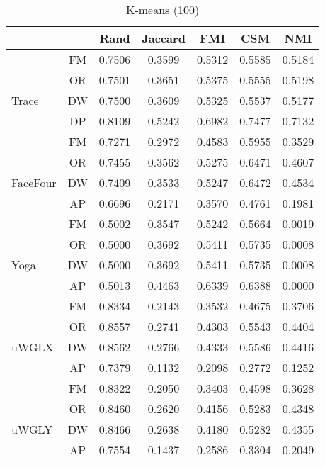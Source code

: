 \begin{table}
\caption{\label{kmucr}K-means (100)}
\centering\\
\begin{tabular}{lcccccc}
\hline
& & {\sf Rand} & {\sf Jaccard} & {\sf FMI} & {\sf CSM} & {\sf NMI} \\
\hline 
& FM &  0.7506&  0.3599&  0.5312&  0.5585&  0.5184\\
& OR &  0.7501&  0.3651&  0.5375&  0.5555&  0.5198\\
Trace & DW &  0.7500&  0.3609&  0.5325&  0.5537&  0.5177\\
& DP & 0.8109 & 0.5242 & 0.6982 & 0.7477 & 0.7132 \\
\hline
& FM &  0.7271&  0.2972&  0.4583&  0.5955&  0.3529\\
& OR &  0.7455&  0.3562&  0.5275&  0.6471&  0.4607\\
FaceFour & DW &  0.7409&  0.3533&  0.5247&  0.6472& 0.4534 \\
& AP & 0.6696 & 0.2171 & 0.3570 & 0.4761 & 0.1981 \\
\hline
& FM &  0.5002&  0.3547&  0.5242&  0.5664& 0.0019 \\
& OR &  0.5000&  0.3692&  0.5411&  0.5735& 0.0008 \\
Yoga & DW &  0.5000& 0.3692&  0.5411&  0.5735&  0.0008  \\
& AP & 0.5013 & 0.4463 & 0.6339& 0.6388 & 0.0000 \\
\hline
& FM &  0.8334&  0.2143& 0.3532&  0.4675& 0.3706 \\
& OR &  0.8557&  0.2741& 0.4303&  0.5543& 0.4404  \\
uWGLX& DW &  0.8562&  0.2766&  0.4333&  0.5586& 0.4416  \\
& AP & 0.7379 & 0.1132 & 0.2098 & 0.2772 & 0.1252 \\
\hline
& FM &  0.8322&  0.2050&  0.3403&  0.4598& 0.3628 \\
& OR &  0.8460&  0.2620&  0.4156&  0.5283& 0.4348 \\
uWGLY& DW &  0.8466&  0.2638&  0.4180&  0.5282& 0.4355 \\
& AP & 0.7554 & 0.1437 & 0.2586 & 0.3304 & 0.2049 \\
\hline
\end{tabular}
\end{table}